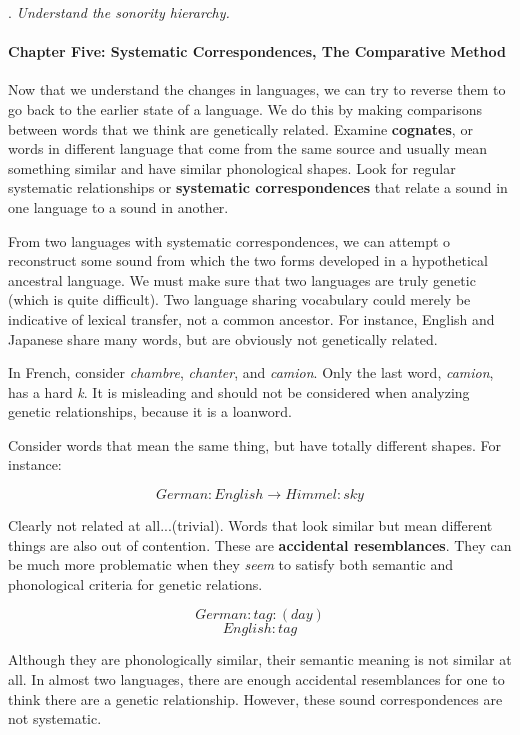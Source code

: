 \documentclass{exam}
\begin{document}
. \textit{Understand the sonority hierarchy.} 


\paragraph{Chapter Five: Systematic Correspondences, The Comparative Method}

\noindent Now that we understand the changes in languages, we can try to reverse them to go back to the earlier state of a language. We do this by making comparisons between words that we think are genetically related. Examine \textbf{cognates}, or words in different language that come from the same source and usually mean something similar and have similar phonological shapes. Look for regular systematic relationships or \textbf{systematic correspondences} that relate a sound in one language to a sound in another. 

From two languages with systematic correspondences, we can attempt o reconstruct some sound from which the two forms developed in a hypothetical ancestral language. We must make sure that two languages are truly genetic (which is quite difficult). Two language sharing vocabulary could merely be indicative of lexical transfer, not a common ancestor. For instance, English and Japanese share many words, but are obviously not genetically related. 

In French, consider \textit{chambre}, \textit{chanter}, and \textit{camion}. Only the last word, \textit{camion}, has a hard \textit{k}. It is misleading and should not be considered when analyzing genetic relationships, because it is a loanword. 

Consider words that mean the same thing, but have totally different shapes. For instance:

$$German:English \rightarrow  Himmel:sky$$ 

Clearly not related at all...(trivial). Words that look similar but mean different things are also out of contention. These are \textbf{accidental resemblances}. They can be much more problematic when they \textit{seem} to satisfy both semantic and phonological criteria for genetic relations.

$$German: tag: (day)$$
$$English: tag$$

Although they are phonologically similar, their semantic meaning is not similar at all. In almost two languages, there are enough accidental resemblances for one to think there are a genetic relationship. However, these sound correspondences are not systematic. 
\end{document}
